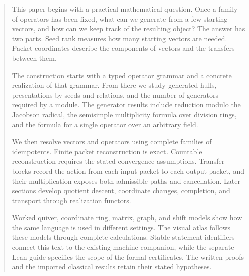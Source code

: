 \documentclass[11pt]{article}
\theoremstyle{definition}
\theoremstyle{remark}
\theoremstyle{definition}\newtheorem{example}[theorem]{Example}
\begin{document}
\KomorebiCover
\begin{abstract}
This paper begins with a practical mathematical question. Once a family of operators has been fixed, what can we generate from a few starting vectors, and how can we keep track of the resulting object? The answer has two parts. Seed rank measures how many starting vectors are needed. Packet coordinates describe the components of vectors and the transfers between them.

The construction starts with a typed operator grammar and a concrete realization of that grammar. From there we study generated hulls, presentations by seeds and relations, and the number of generators required by a module. The generator results include reduction modulo the Jacobson radical, the semisimple multiplicity formula over division rings, and the formula for a single operator over an arbitrary field.

We then resolve vectors and operators using complete families of idempotents. Finite packet reconstruction is exact. Countable reconstruction requires the stated convergence assumptions. Transfer blocks record the action from each input packet to each output packet, and their multiplication exposes both admissible paths and cancellation. Later sections develop quotient descent, coordinate changes, completion, and transport through realization functors.

Worked quiver, coordinate ring, matrix, graph, and shift models show how the same language is used in different settings. The visual atlas follows these models through complete calculations. Stable statement identifiers connect this text to the existing machine companion, while the separate Lean guide specifies the scope of the formal certificates. The written proofs and the imported classical results retain their stated hypotheses.
\end{abstract}

\clearpage
\begingroup\small{}\tableofcontents\endgroup
\clearpage


\clearpage{}





\end{document}
